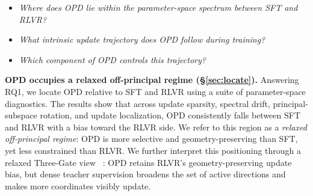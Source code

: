 






\begin{tcolorbox}[
    colback=white!2,
    colframe=white!15,
    boxrule=0pt,
    arc=5pt,
    left=5pt,right=5pt,top=1pt,bottom=2pt
]
\begin{itemize}[leftmargin=1.8em,itemsep=2pt,topsep=2pt]
    \item[\textbf{RQ1}] \emph{Where does OPD lie within the parameter-space spectrum between SFT and RLVR?}
    \item[\textbf{RQ2}] \emph{What intrinsic update trajectory does OPD follow during training?}
    \item[\textbf{RQ3}] \emph{Which component of OPD controls this trajectory?}
\end{itemize}
\vspace{-1em}
\end{tcolorbox}

\textbf{OPD occupies a relaxed off-principal regime
(\S\ref{sec:locate}).}
Answering RQ1, we locate OPD relative to SFT and RLVR using a suite of
parameter-space diagnostics. The results show that across update sparsity, spectral drift, principal-subspace rotation, and update localization, OPD consistently falls between SFT and RLVR with a  bias toward the RLVR side. We refer to this region as a \emph{relaxed off-principal regime}: OPD is more selective and geometry-preserving than SFT, yet less constrained than RLVR. We further interpret this positioning through a relaxed Three-Gate view ~\cite{zhu2025pnt}: OPD retains RLVR's geometry-preserving update bias, but dense teacher supervision broadens the set of active directions and makes more coordinates visibly update.

